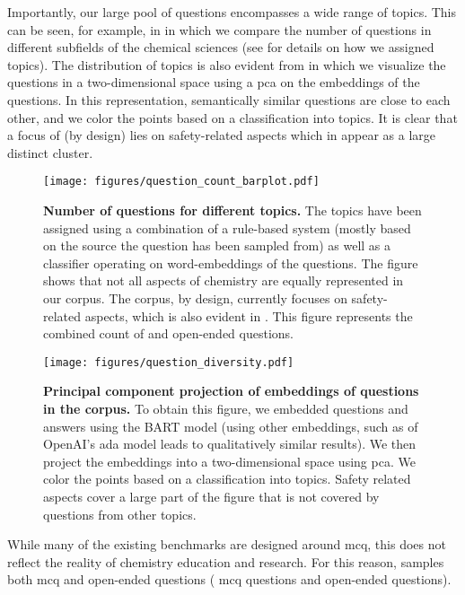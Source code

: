 \documentclass[11pt, oneside]{article}
\begin{document}
\begin{refsection}
Importantly, our large pool of questions encompasses a wide range of topics.
This can be seen, for example, in  in which we compare the number of questions in different subfields of the chemical sciences (see  for details on how we assigned topics).
The distribution of topics is also evident from  in which we visualize the questions in a two-dimensional space using a \gls{pca} on the embeddings of the questions.
In this representation, semantically similar questions are close to each other, and we color the points based on a classification into  topics. 
It is clear that a focus of \chembench (by design) lies on safety-related aspects which in  appear as a large distinct cluster.


\begin{figure}[!htb]
    \centering
    \texttt{[image: figures/question\_count\_barplot.pdf]}
    \caption{\textbf{Number of questions for different topics.} The topics have been assigned using a combination of a rule-based system (mostly based on the source the question has been sampled from) as well as a classifier operating on word-embeddings of the questions. 
    The figure shows that not all aspects of chemistry are equally represented in our corpus. The \chembench corpus, by design, currently focuses on safety-related aspects, which is also evident in . This figure represents the combined count of  and open-ended questions.}
    \label{fig:topic_barplot}
\end{figure}

\begin{figure}[!htb]
    \centering
    \texttt{[image: figures/question\_diversity.pdf]}
    \caption{\textbf{Principal component projection of embeddings of questions in the \chembench corpus.} To obtain this figure, we embedded questions and answers using the BART model\autocite{bart} (using other embeddings, such as of OpenAI's ada model leads to qualitatively similar results). We then project the embeddings into a two-dimensional space using \gls{pca}. We color the points based on a classification into topics. Safety related aspects cover a large part of the figure that is not covered by questions from other topics.}
    \label{fig:question_diversity}
\end{figure}

While many of the existing benchmarks are designed around \gls{mcq}, this does not reflect the reality of chemistry education and research.
For this reason, \chembench samples both \gls{mcq} and open-ended questions ( \gls{mcq} questions and  open-ended questions).



\end{refsection}
\end{document}
